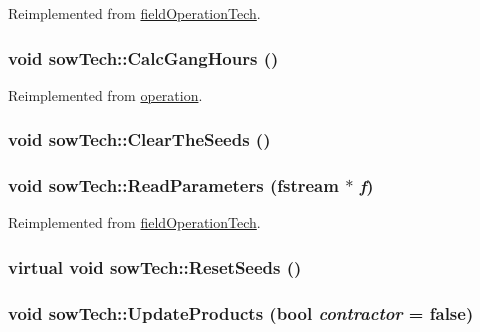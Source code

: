 Reimplemented from \hyperlink{classfield_operation_tech_a908e81a53479de1a6768d58964dbc57c}{fieldOperationTech}.\hypertarget{classsow_tech_aec37925c5aa7d1ea82df758921c8fdc3}{
\subsubsection[{CalcGangHours}]{\setlength{\rightskip}{0pt plus 5cm}void sowTech::CalcGangHours ()}}
\label{classsow_tech_aec37925c5aa7d1ea82df758921c8fdc3}


Reimplemented from \hyperlink{classoperation_a51c5612f29519bc82050ffccf089bc07}{operation}.\hypertarget{classsow_tech_ab449c30df32928c4d35b52dd60fbfb75}{
\subsubsection[{ClearTheSeeds}]{\setlength{\rightskip}{0pt plus 5cm}void sowTech::ClearTheSeeds ()}}
\label{classsow_tech_ab449c30df32928c4d35b52dd60fbfb75}
\hypertarget{classsow_tech_aa606f377adfc0cf3fd80d96ba2576fcc}{
\subsubsection[{ReadParameters}]{\setlength{\rightskip}{0pt plus 5cm}void sowTech::ReadParameters (fstream $\ast$ {\em f})}}
\label{classsow_tech_aa606f377adfc0cf3fd80d96ba2576fcc}


Reimplemented from \hyperlink{classfield_operation_tech_a2a2c416f3f3fe8ceb2f1f1b63c149a09}{fieldOperationTech}.\hypertarget{classsow_tech_a1f109785f7a75ea155724d5eaa4d29fb}{
\subsubsection[{ResetSeeds}]{\setlength{\rightskip}{0pt plus 5cm}virtual void sowTech::ResetSeeds ()}}
\label{classsow_tech_a1f109785f7a75ea155724d5eaa4d29fb}
\hypertarget{classsow_tech_a0cfbd371272aa15a18bca486a2926464}{
\subsubsection[{UpdateProducts}]{\setlength{\rightskip}{0pt plus 5cm}void sowTech::UpdateProducts (bool {\em contractor} = {\ttfamily false})}}
\label{classsow_tech_a0cfbd371272aa15a18bca486a2926464}


